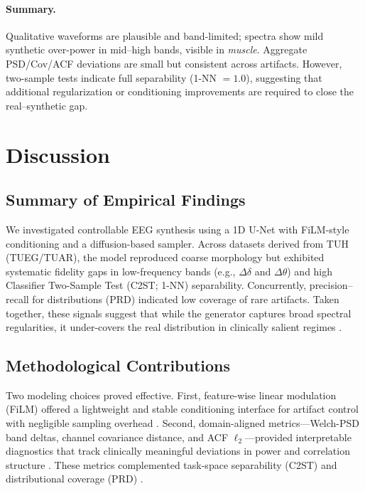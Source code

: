 \documentclass{article}
\begin{document}
\paragraph{Summary.}
Qualitative waveforms are plausible and band-limited; spectra show mild synthetic over-power in mid–high bands, visible in \emph{muscle}. Aggregate PSD/Cov/ACF deviations are small but consistent across artifacts. However, two-sample tests indicate full separability (1-NN $=1.0$), suggesting that additional regularization or conditioning improvements are required to close the real–synthetic gap.



\section{Discussion}

\subsection{Summary of Empirical Findings}
We investigated controllable EEG synthesis using a 1D U-Net with FiLM-style conditioning and a diffusion-based sampler. Across datasets derived from TUH (TUEG/TUAR), the model reproduced coarse morphology but exhibited systematic fidelity gaps in low-frequency bands (e.g., $\Delta\delta$ and $\Delta\theta$) and high Classifier Two-Sample Test (C2ST; 1-NN) separability. Concurrently, precision--recall for distributions (PRD) indicated low coverage of rare artifacts. Taken together, these signals suggest that while the generator captures broad spectral regularities, it under-covers the real distribution in clinically salient regimes \citep{lopezpaz2017c2st,sajjadi2018prd}.

\subsection{Methodological Contributions}
Two modeling choices proved effective. First, feature-wise linear modulation (FiLM) offered a lightweight and stable conditioning interface for artifact control with negligible sampling overhead \citep{perez2018film}. Second, domain-aligned metrics---Welch-PSD band deltas, channel covariance distance, and ACF $\ell_2$---provided interpretable diagnostics that track clinically meaningful deviations in power and correlation structure \citep{welch1967psd}. These metrics complemented task-space separability (C2ST) and distributional coverage (PRD) \citep{lopezpaz2017c2st,sajjadi2018prd}.
\end{document}
